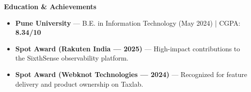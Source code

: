 \documentclass[10pt]{article}
\newcommand{\sectiontitle}[1]{%
  \par\vspace{8pt}%
  \noindent\textbf{\large #1}\par
  \vspace{-2pt}\noindent\hrulefill\par
  \vspace{4pt}%
}
\begin{document}
\sectiontitle{Education \& Achievements}

\begin{itemize}
  \item \textbf{Pune University} --- B.E. in Information Technology (May 2024) | CGPA: \textbf{8.34/10}
  \item \textbf{Spot Award (Rakuten India --- 2025)} --- High-impact contributions to the SixthSense observability platform.
  \item \textbf{Spot Award (Webknot Technologies --- 2024)} --- Recognized for feature delivery and product ownership on Taxlab.
\end{itemize}
\end{document}
